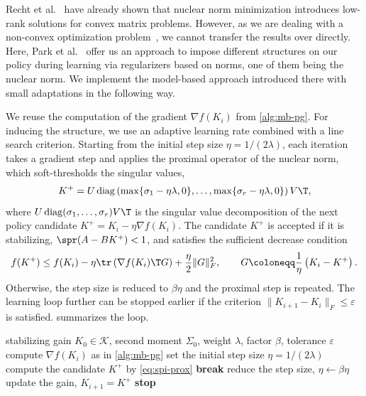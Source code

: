 Recht et al.~\cite{Recht2010Guaranteed} have already shown that nuclear norm minimization introduces
low-rank solutions for convex matrix problems. However, as we are dealing with a non-convex optimization
problem~\cite{Fazel2018Global}, we cannot transfer the results over directly. Here, Park et al.~\cite{Park2020Structured}
offer us an approach to impose different structures on our policy during learning via regularizers
based on norms, one of them being the nuclear norm. We implement the model-based approach introduced there
with small adaptations in the following way.

We reuse the computation of the gradient $\nabla f(K_i)$ from \cref{alg:mb-pg}.
For inducing the structure, we use an adaptive learning rate combined with a line search criterion.
Starting from the initial step size $\eta = 1 / (2 \lambda)$, each iteration takes a gradient step and applies the
proximal operator of the nuclear norm, which soft-thresholds the singular values,
\begin{equation}
    \label{eq:spi-prox}
    K^{+} = U \operatorname{diag} \left( \max\{\sigma_1 - \eta \lambda, 0\}, \dots,
    \max\{\sigma_r - \eta \lambda, 0\} \right) V\T ,
\end{equation}
where $U \operatorname{diag}(\sigma_1, \dots, \sigma_r) V\T$ is the singular value decomposition of
the next policy candidate $K^{+} = K_i - \eta \nabla f(K_i)$. The candidate $K^{+}$ is accepted if it is stabilizing, $\spr(A - B K^{+}) < 1$, and
satisfies the sufficient decrease condition
\begin{equation}
    \label{eq:spi-sufficient-decrease}
    f(K^{+}) \leq f(K_i) - \eta \tr \left( \nabla f(K_i)\T G \right) + \frac{\eta}{2} \lVert G \rVert_F^2 ,
    \qquad G \coloneqq \frac{1}{\eta} \left( K_i - K^{+} \right) .
\end{equation}
Otherwise, the step size is reduced to $\beta \eta$ and the proximal step is repeated. The learning loop further can be
stopped earlier if the criterion $\lVert K_{i+1} - K_i \rVert_F \leq \varepsilon$ is satisfied.
 summarizes the loop.
\begin{algorithm}[htbp]
    \caption{S-PI}
    \label{alg:mb-spi}
    \begin{algorithmic}[1]
        \REQUIRE stabilizing gain $K_0 \in \mathcal{K}$, second moment $\Sigma_0$, weight $\lambda$, factor $\beta$,
        tolerance $\varepsilon$
            \STATE compute $\nabla f(K_i)$ as in \cref{alg:mb-pg}
            \STATE set the initial step size $\eta = 1 / (2 \lambda)$
                \STATE compute the candidate $K^{+}$ by \eqref{eq:spi-prox}
                    \STATE \textbf{break}
                \ENDIF
                \STATE reduce the step size, $\eta \leftarrow \beta \eta$
            \ENDFOR
            \STATE update the gain, $K_{i+1} = K^{+}$
                \STATE \textbf{stop}
            \ENDIF
        \ENDFOR
    \end{algorithmic}
\end{algorithm}

